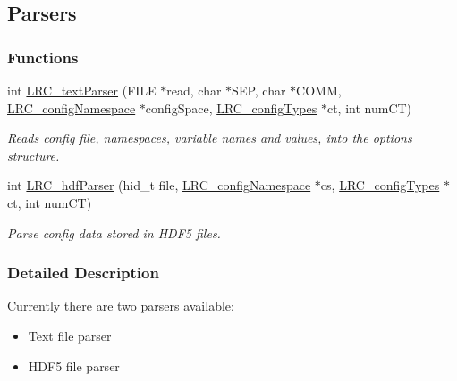 \hypertarget{group___l_r_c__parser}{
\subsection{Parsers}
\label{group___l_r_c__parser}
}
\subsubsection*{Functions}
\begin{CompactItemize}
\item 
int \hyperlink{group___l_r_c__parser_g4b1c98d54591fd4d05cc1caee09cbd35}{LRC\_\-textParser} (FILE $\ast$read, char $\ast$SEP, char $\ast$COMM, \hyperlink{struct_l_r_c__config_namespace}{LRC\_\-configNamespace} $\ast$configSpace, \hyperlink{struct_l_r_c__config_types}{LRC\_\-configTypes} $\ast$ct, int numCT)
\begin{CompactList}\small\item\em Reads config file, namespaces, variable names and values, into the options structure. \item\end{CompactList}\item 
int \hyperlink{group___l_r_c__parser_g3cbf6e172a98da00ec8fd0b301b4b8f9}{LRC\_\-hdfParser} (hid\_\-t file, \hyperlink{struct_l_r_c__config_namespace}{LRC\_\-configNamespace} $\ast$cs, \hyperlink{struct_l_r_c__config_types}{LRC\_\-configTypes} $\ast$ct, int numCT)
\begin{CompactList}\small\item\em Parse config data stored in HDF5 files. \item\end{CompactList}\end{CompactItemize}


\subsubsection{Detailed Description}
Currently there are two parsers available:\begin{itemize}
\item Text file parser 
\item HDF5 file parser 
\end{itemize}


